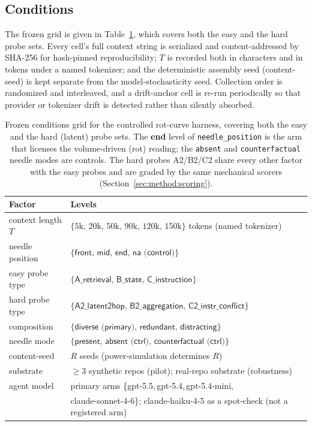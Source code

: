 \documentclass[11pt]{article}
\begin{document}
\subsection{Conditions}
\label{sec:method:conditions}

The frozen grid is given in Table~\ref{tab:conditions}, which covers both the easy and the hard
probe sets. Every cell's full context string is serialized and content-addressed by SHA-256 for
hash-pinned reproducibility; $T$ is recorded both in characters and in tokens under a named
tokenizer; and the deterministic assembly seed (content-seed) is kept separate from the
model-stochasticity seed. Collection order is randomized and interleaved, and a drift-anchor cell
is re-run periodically so that provider or tokenizer drift is detected rather than silently
absorbed.

\begin{table}[t]
\centering
\caption{Frozen conditions grid for the controlled rot-curve harness, covering both the easy and
the hard (latent) probe sets. The \textbf{end} level of \texttt{needle\_position} is the arm that
licenses the volume-driven (rot) reading; the \texttt{absent} and \texttt{counterfactual} needle
modes are controls. The hard probes A2/B2/C2 share every other factor with the easy probes and are
graded by the same mechanical scorers (Section~\ref{sec:method:scoring}).}
\label{tab:conditions}
\small
\begin{tabular}{@{}ll@{}}
\toprule
\textbf{Factor} & \textbf{Levels} \\
\midrule
context length $T$ & $\{5\mathrm{k},\,20\mathrm{k},\,50\mathrm{k},\,90\mathrm{k},\,120\mathrm{k},\,150\mathrm{k}\}$ tokens (named tokenizer) \\
needle position & $\{\textsf{front},\,\textsf{mid},\,\textsf{end},\,\textsf{na (control)}\}$ \\
easy probe type & $\{\textsf{A\_retrieval},\,\textsf{B\_state},\,\textsf{C\_instruction}\}$ \\
hard probe type & $\{\textsf{A2\_latent2hop},\,\textsf{B2\_aggregation},\,\textsf{C2\_instr\_conflict}\}$ \\
composition & $\{\textsf{diverse (primary)},\,\textsf{redundant},\,\textsf{distracting}\}$ \\
needle mode & $\{\textsf{present},\,\textsf{absent (ctrl)},\,\textsf{counterfactual (ctrl)}\}$ \\
content-seed & $R$ seeds (power-simulation determines $R$) \\
substrate & $\geq 3$ synthetic repos (pilot); real-repo substrate (robustness) \\
agent model & primary arms \{\textsf{gpt-5.5},\,\textsf{gpt-5.4},\,\textsf{gpt-5.4-mini}, \\
            & \textsf{claude-sonnet-4-6}\}; \textsf{claude-haiku-4-5} as a spot-check (not a registered arm) \\
\bottomrule
\end{tabular}
\end{table}
\end{document}

